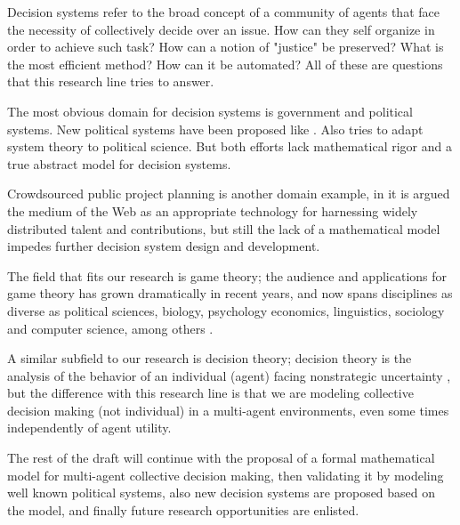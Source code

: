 Decision systems refer to the broad concept of a community of agents that face the necessity of collectively decide over an issue. How can they self organize in order to achieve such task? How can a notion of "justice" be preserved? What is the most efficient method? How can it be automated? All of these are questions that this research line tries to answer.

The most obvious domain for decision systems is government and political systems. New political systems have been proposed like \cite{anewpoliticalsystem}. Also \cite{politicallife} tries to adapt system theory to political science. But both efforts lack mathematical rigor and a true abstract model for decision systems.

Crowdsourced public project planning is another domain example, in \cite{crowdsourcing} it is argued the medium of the Web as an appropriate technology for harnessing widely distributed talent and contributions, but still the lack of a mathematical model impedes further decision system design and development.

The field that fits our research is game theory; the audience and applications for game theory has grown dramatically in recent years, and now spans disciplines as diverse as political sciences, biology, psychology economics, linguistics, sociology and computer science, among others \cite{gametheory}.

A similar subfield to our research is decision theory; decision theory is the analysis of the behavior of an individual (agent) facing nonstrategic uncertainty \cite{decisiontheory}, but the difference with this research line is that we are modeling collective decision making (not individual) in a multi-agent environments, even some times independently of agent utility.

The rest of the draft will continue with the proposal of a formal mathematical model for multi-agent collective decision making, then validating it by modeling well known political systems, also new decision systems are proposed based on the model, and finally future research opportunities are enlisted. 